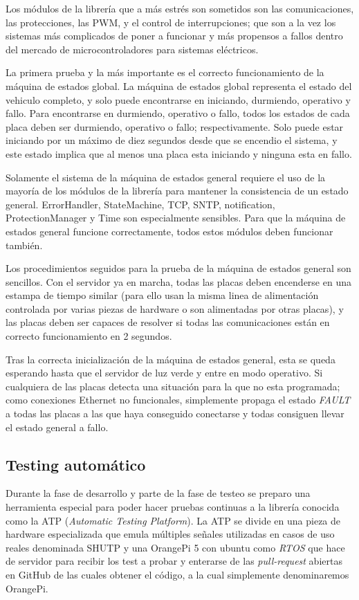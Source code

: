 \documentclass{report}
\begin{document}
\par \vspace{0.3cm}
Los módulos de la librería que a más estrés son sometidos son las comunicaciones, las protecciones, las PWM, y el control de interrupciones; que son a la vez los sistemas más complicados de poner a funcionar y más propensos a fallos dentro del mercado de microcontroladores para sistemas eléctricos.
\par 
La primera prueba y la más importante es el correcto funcionamiento de la máquina de estados global. La máquina de estados global representa el estado del vehiculo completo, y solo puede encontrarse en iniciando, durmiendo, operativo y fallo. Para encontrarse en durmiendo, operativo o fallo, todos los estados de cada placa deben ser durmiendo, operativo o fallo; respectivamente. Solo puede estar iniciando por un máximo de diez segundos desde que se encendio el sistema, y este estado implica que al menos una placa esta iniciando y ninguna esta en fallo. 
\par \vspace{0.3cm}
Solamente el sistema de la máquina de estados general requiere el uso de la mayoría de los módulos de la librería para mantener la consistencia de un estado general. ErrorHandler, StateMachine, TCP, SNTP, notification, ProtectionManager y Time son especialmente sensibles. Para que la máquina de estados general funcione correctamente, todos estos módulos deben funcionar también. \par
Los procedimientos seguidos para la prueba de la máquina de estados general son sencillos. Con el servidor ya en marcha, todas las placas deben encenderse en una estampa de tiempo similar (para ello usan la misma linea de alimentación controlada por varias piezas de hardware o son alimentadas por otras placas), y las placas deben ser capaces de resolver si todas las comunicaciones están en correcto funcionamiento en 2 segundos. 
\par
Tras la correcta inicialización de la máquina de estados general, esta se queda esperando hasta que el servidor de luz verde y entre en modo operativo. Si cualquiera de las placas detecta una situación para la que no esta programada; como conexiones Ethernet no funcionales, simplemente propaga el estado \textit{FAULT} a todas las placas a las que haya conseguido conectarse y todas consiguen llevar el estado general a fallo. 

\subsection{Testing automático}
Durante la fase de desarrollo y parte de la fase de testeo se preparo una herramienta especial para poder hacer pruebas continuas a la librería conocida como la ATP (\textit{Automatic Testing Platform}). La ATP se divide en una pieza de hardware especializada que emula múltiples señales utilizadas en casos de uso reales denominada SHUTP y una OrangePi 5 con ubuntu como \textit{RTOS} que hace de servidor para recibir los test a probar y enterarse de las \textit{pull-request} abiertas en GitHub de las cuales obtener el código, a la cual simplemente denominaremos OrangePi. \par \vspace{0.3cm}
\end{document}
